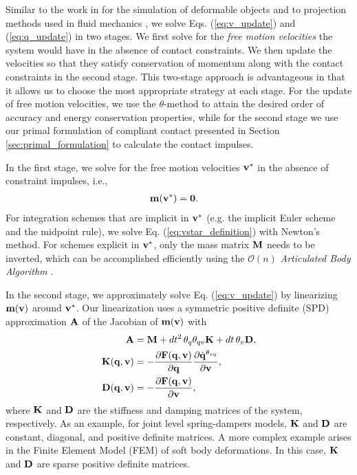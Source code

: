Similar to the work in \cite{bib:duriez2005realistic} for the simulation of
deformable objects and to projection methods used in fluid mechanics
\cite{bib::bell1991efficient}, we solve Eqs. (\ref{eq:v_update}) and
(\ref{eq:q_update}) in two stages. We first solve for the \emph{free motion
velocities} the system would have in the absence of contact constraints. We then
update the velocities so that they satisfy conservation of momentum along with
the contact constraints in the second stage. This two-stage approach is
advantageous in that it allows us to choose the most appropriate strategy at
each stage. For the update of free motion velocities, we use the
$\theta\text{-method}$ to attain the desired order of accuracy and energy
conservation properties, while for the second stage we use our primal
formulation of compliant contact presented in Section
\ref{sec:primal_formulation} to calculate the contact impulses.

In the first stage, we solve for the free motion velocities ${\mathbf{v}}^*$ in the
absence of constraint impulses, i.e.,
\begin{align}
	\mf{m}(\mf{v}^*) &= \mf{0}.
	\label{eq:vstar_definition}
\end{align}
For integration schemes that are implicit in ${\mathbf{v}}^*$ (e.g. the implicit Euler
scheme and the midpoint rule), we solve Eq. (\ref{eq:vstar_definition}) with
Newton's method. For schemes explicit in ${\mathbf{v}}^*$, only the mass matrix
${\mathbf{M}}$ needs to be inverted, which can be accomplished efficiently using the
$\mathcal{O}(n)$ \emph{Articulated Body Algorithm}
\cite{bib:featherstone2008_rigid_body_dynamics_algorithms}.

In the second stage, we approximately solve Eq. (\ref{eq:v_update}) by
linearizing ${\mathbf{m}}({\mathbf{v}})$ around ${\mathbf{v}}^*$. Our linearization uses a
symmetric positive definite (SPD)  approximation ${\mathbf{A}}$ of the Jacobian
of ${\mathbf{m}}({\mathbf{v}})$ with
\begin{align}
	\mf{A}&=\mf{M}+dt^2\,\theta_q\theta_{qv}\mf{K}+dt\,\theta_v\mf{D},
	\label{eq:expression_for_A}\\
	\mf{K}(\mf{q}, \mf{v})&=-\frac{\partial \mf{F}(\mf{q}, \mf{v})}{\partial
	\mf{q}}\frac{\partial\dot{\mf{q}}^{\theta_{vq}}}{\partial\mf{v}},
	\label{eq:stiffness_matrix}\\
	\mf{D}(\mf{q}, \mf{v})&=-\frac{\partial \mf{F}(\mf{q}, \mf{v})}{\partial
	\mf{v}},
	\label{eq:dissipation_matrix}
\end{align}
where ${\mathbf{K}}$ and ${\mathbf{D}}$ are the stiffness and damping matrices of the
system, respectively. As an example, for joint level spring-dampers models,
${\mathbf{K}}$ and ${\mathbf{D}}$ are constant, diagonal, and positive definite matrices. A
more complex example arises in the Finite Element Model (FEM) of soft body
deformations. In this case, ${\mathbf{K}}$ and ${\mathbf{D}}$ are sparse positive definite
matrices.

